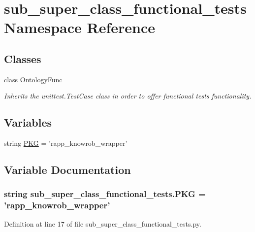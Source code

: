 \hypertarget{namespacesub__super__class__functional__tests}{\section{sub\-\_\-super\-\_\-class\-\_\-functional\-\_\-tests Namespace Reference}
\label{namespacesub__super__class__functional__tests}
}
\subsection*{Classes}
\begin{DoxyCompactItemize}
\item 
class \hyperlink{classsub__super__class__functional__tests_1_1OntologyFunc}{Ontology\-Func}
\begin{DoxyCompactList}\small\item\em Inherits the unittest.\-Test\-Case class in order to offer functional tests functionality. \end{DoxyCompactList}\end{DoxyCompactItemize}
\subsection*{Variables}
\begin{DoxyCompactItemize}
\item 
string \hyperlink{namespacesub__super__class__functional__tests_ada1c0f658bafb55ac452a8dfd6418c74}{P\-K\-G} = 'rapp\-\_\-knowrob\-\_\-wrapper'
\end{DoxyCompactItemize}


\subsection{Variable Documentation}
\hypertarget{namespacesub__super__class__functional__tests_ada1c0f658bafb55ac452a8dfd6418c74}{
\subsubsection[{P\-K\-G}]{\setlength{\rightskip}{0pt plus 5cm}string sub\-\_\-super\-\_\-class\-\_\-functional\-\_\-tests.\-P\-K\-G = 'rapp\-\_\-knowrob\-\_\-wrapper'}}\label{namespacesub__super__class__functional__tests_ada1c0f658bafb55ac452a8dfd6418c74}


Definition at line 17 of file sub\-\_\-super\-\_\-class\-\_\-functional\-\_\-tests.\-py.

